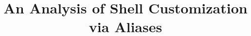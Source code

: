 \documentclass[sigconf,review, anonymous]{acmart}
\begin{document}
\title{An Analysis of Shell Customization via Aliases}

%

\begin{abstract}
	
\end{abstract}

\maketitle



















\end{document}
